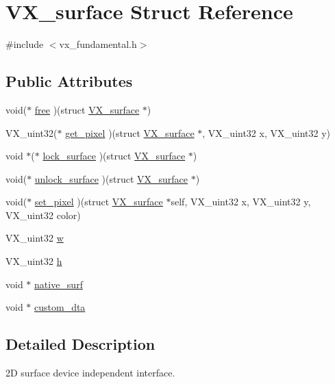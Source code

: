 \hypertarget{structVX__surface}{\section{V\-X\-\_\-surface Struct Reference}
\label{structVX__surface}
}


{\ttfamily \#include $<$vx\-\_\-fundamental.\-h$>$}

\subsection*{Public Attributes}
\begin{DoxyCompactItemize}
\item 
void($\ast$ \hyperlink{structVX__surface_af05225cd11073b92fa78b008f6291afc}{free} )(struct \hyperlink{structVX__surface}{V\-X\-\_\-surface} $\ast$)
\item 
V\-X\-\_\-uint32($\ast$ \hyperlink{structVX__surface_a313aa54a57337a8f8070d93366f7bf9a}{get\-\_\-pixel} )(struct \hyperlink{structVX__surface}{V\-X\-\_\-surface} $\ast$, V\-X\-\_\-uint32 x, V\-X\-\_\-uint32 y)
\item 
void $\ast$($\ast$ \hyperlink{structVX__surface_a869959bbf25e863c3141373df651632d}{lock\-\_\-surface} )(struct \hyperlink{structVX__surface}{V\-X\-\_\-surface} $\ast$)
\item 
void($\ast$ \hyperlink{structVX__surface_a6799675cf75bf7566a83a07b3c6bc905}{unlock\-\_\-surface} )(struct \hyperlink{structVX__surface}{V\-X\-\_\-surface} $\ast$)
\item 
void($\ast$ \hyperlink{structVX__surface_ac748fac37c089a449fad15c684af9a08}{set\-\_\-pixel} )(struct \hyperlink{structVX__surface}{V\-X\-\_\-surface} $\ast$self, V\-X\-\_\-uint32 x, V\-X\-\_\-uint32 y, V\-X\-\_\-uint32 color)
\item 
V\-X\-\_\-uint32 \hyperlink{structVX__surface_a5e708ffe93416a4cb992f0decb6b739c}{w}
\item 
V\-X\-\_\-uint32 \hyperlink{structVX__surface_aceb5bfc1d1c476822769082e329b8980}{h}
\item 
void $\ast$ \hyperlink{structVX__surface_a8e6a8530748746a2803534d1ea761190}{native\-\_\-surf}
\item 
void $\ast$ \hyperlink{structVX__surface_a5faa56b99a0541b5e61db3a04d5aa6bc}{custom\-\_\-dta}
\end{DoxyCompactItemize}


\subsection{Detailed Description}
2\-D surface device independent interface. 

